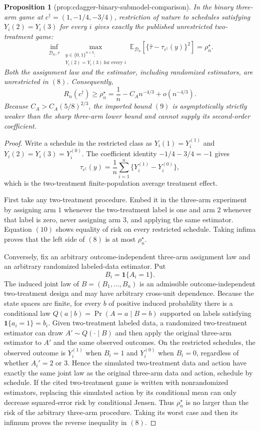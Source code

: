 \documentclass{article}
\newtheorem{proposition}{Proposition}
\begin{document}
{\begin{proposition}[prop:cdagger-binary-submodel-comparison]\label{prop:cdagger-binary-submodel-comparison}
In the binary three-arm game at \(c^\dagger=(1,-1/4,-3/4)\), restriction of nature to schedules satisfying \(Y_i(2)=Y_i(3)\) for every \(i\) gives exactly the published unrestricted two-treatment game:
\[
 \inf_{\mathcal D_n,\widehat\tau}
 \max_{\substack{y\in\{0,1\}^{n\times3}:\\Y_i(2)=Y_i(3)\ \text{for every }i}}
 \mathbb E_{\mathcal D_n}\!\left[
 \{\widehat\tau-\tau_{c^\dagger}(y)\}^2\right]
 =\rho_n^\star.
\tag{8}
\]
Both the assignment law and the estimator, including randomized estimators, are unrestricted in \((8)\).  Consequently,
\[
 R_n(c^\dagger)\ge\rho_n^\star
 =\frac1n-C_An^{-4/3}+o(n^{-4/3}).
\tag{9}
\]
Because
\(C_A>C_A(5/8)^{2/3}\), the imported bound \((9)\) is asymptotically strictly weaker than the sharp three-arm lower bound and cannot supply its second-order coefficient.
\end{proposition}
\begin{proof}
Write a schedule in the restricted class as
\(
Y_i(1)=Y_i^{(1)}
\) and
\(
Y_i(2)=Y_i(3)=Y_i^{(0)}
\).  The coefficient identity \(-1/4-3/4=-1\) gives
\[
 \tau_{c^\dagger}(y)
 =\frac1n\sum_{i=1}^n\{Y_i^{(1)}-Y_i^{(0)}\},
\tag{10}
\]
which is the two-treatment finite-population average treatment effect.

First take any two-treatment procedure.  Embed it in the three-arm experiment by assigning arm \(1\) whenever the two-treatment label is one and arm \(2\) whenever that label is zero, never assigning arm \(3\), and applying the same estimator.  Equation \((10)\) shows equality of risk on every restricted schedule.  Taking infima proves that the left side of \((8)\) is at most \(\rho_n^\star\).

Conversely, fix an arbitrary outcome-independent three-arm assignment law and an arbitrary randomized labeled-data estimator.  Put
\[
 B_i=\mathbf1\{A_i=1\}.
\]
The induced joint law of \(B=(B_1,\ldots,B_n)\) is an admissible outcome-independent two-treatment design and may have arbitrary cross-unit dependence.  Because the state spaces are finite, for every \(b\) of positive induced probability there is a conditional law
\(
Q(a\mid b)=\Pr(A=a\mid B=b)
\)
supported on labels satisfying
\(
\mathbf1\{a_i=1\}=b_i
\).  Given two-treatment labeled data, a randomized two-treatment estimator can draw \(A'\sim Q(\cdot\mid B)\) and then apply the original three-arm estimator to \(A'\) and the same observed outcomes.  On the restricted schedules, the observed outcome is \(Y_i^{(1)}\) when \(B_i=1\) and \(Y_i^{(0)}\) when \(B_i=0\), regardless of whether \(A_i'=2\) or \(3\).  Hence the simulated two-treatment data and action have exactly the same joint law as the original three-arm data and action, schedule by schedule.  If the cited two-treatment game is written with nonrandomized estimators, replacing this simulated action by its conditional mean can only decrease squared-error risk by conditional Jensen.  Thus \(\rho_n^\star\) is no larger than the risk of the arbitrary three-arm procedure.  Taking its worst case and then its infimum proves the reverse inequality in \((8)\).


\end{proof}}
\end{document}
